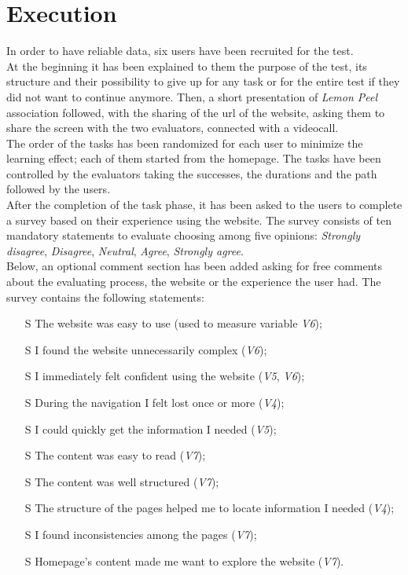 \documentclass[../../UsabilityReport.tex]{subfiles}
\begin{document}
\section{Execution}
	In order to have reliable data, six users have been recruited for the test.\\
	At the beginning it has been explained to them the purpose of the test, its structure and their possibility to give up for any task or for the entire test if they did not want to continue anymore. Then, a short presentation of \textit{Lemon Peel} association followed, with the sharing of the url of the website, asking them to share the screen with the two evaluators, connected with a videocall.\\
	The order of the tasks has been randomized for each user to minimize the learning effect; each of them started from the homepage. The tasks have been controlled by the evaluators taking the successes, the durations and the path followed by the users.\\
	After the completion of the task phase, it has been asked to the users to complete a survey based on their experience using the website. The survey consists of ten mandatory statements to evaluate choosing among five opinions: \textit{Strongly disagree}, \textit{Disagree}, \textit{Neutral}, \textit{Agree}, \textit{Strongly agree}.\\
	Below, an optional comment section has been added asking for free comments about the evaluating process, the website or the experience the user had.
	The survey contains the following statements:
	\begin{itemize}
		\item[S\subs{1}] The website was easy to use (used to measure variable \textit{V6});
		\item[S\subs{2}] I found the website unnecessarily complex (\textit{V6});
		\item[S\subs{3}] I immediately felt confident using the website (\textit{V5}, \textit{V6});
		\item[S\subs{4}] During the navigation I felt lost once or more (\textit{V4});
		\item[S\subs{5}] I could quickly get the information I needed (\textit{V5});
		\item[S\subs{6}] The content was easy to read (\textit{V7});
		\item[S\subs{7}] The content was well structured (\textit{V7});
		\item[S\subs{8}] The structure of the pages helped me to locate information I needed (\textit{V4});
		\item[S\subs{9}] I found inconsistencies among the pages (\textit{V7});
		\item[S\subs{10}] Homepage’s content made me want to explore the website (\textit{V7}).
	\end{itemize}
\end{document}

